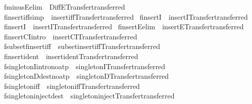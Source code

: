 \begin{isabellebody}
\isamarkupfalse%
\ fminusE{\isacharbrackleft}elim{\isacharbang}{\isacharbrackright}\ {\isacharequal}\ DiffE{\isacharbrackleft}Transfer{\isachardot}transferred{\isacharbrackright}\isanewline
{}\isamarkupfalse%
\ finsert{\isacharunderscore}iff{\isacharbrackleft}simp{\isacharbrackright}\ {\isacharequal}\ insert{\isacharunderscore}iff{\isacharbrackleft}Transfer{\isachardot}transferred{\isacharbrackright}\isanewline
{}\isamarkupfalse%
\ finsertI{}\ {\isacharequal}\ insertI{}{\isacharbrackleft}Transfer{\isachardot}transferred{\isacharbrackright}\isanewline
{}\isamarkupfalse%
\ finsertI{}\ {\isacharequal}\ insertI{}{\isacharbrackleft}Transfer{\isachardot}transferred{\isacharbrackright}\isanewline
{}\isamarkupfalse%
\ finsertE{\isacharbrackleft}elim{\isacharbang}{\isacharbrackright}\ {\isacharequal}\ insertE{\isacharbrackleft}Transfer{\isachardot}transferred{\isacharbrackright}\isanewline
{}\isamarkupfalse%
\ finsertCI{\isacharbrackleft}intro{\isacharbang}{\isacharbrackright}\ {\isacharequal}\ insertCI{\isacharbrackleft}Transfer{\isachardot}transferred{\isacharbrackright}\isanewline
{}\isamarkupfalse%
\ fsubset{\isacharunderscore}finsert{\isacharunderscore}iff\ {\isacharequal}\ subset{\isacharunderscore}insert{\isacharunderscore}iff{\isacharbrackleft}Transfer{\isachardot}transferred{\isacharbrackright}\isanewline
{}\isamarkupfalse%
\ finsert{\isacharunderscore}ident\ {\isacharequal}\ insert{\isacharunderscore}ident{\isacharbrackleft}Transfer{\isachardot}transferred{\isacharbrackright}\isanewline
{}\isamarkupfalse%
\ fsingletonI{\isacharbrackleft}intro{\isacharbang}{\isacharcomma}no{\isacharunderscore}atp{\isacharbrackright}\ {\isacharequal}\ singletonI{\isacharbrackleft}Transfer{\isachardot}transferred{\isacharbrackright}\isanewline
{}\isamarkupfalse%
\ fsingletonD{\isacharbrackleft}dest{\isacharbang}{\isacharcomma}no{\isacharunderscore}atp{\isacharbrackright}\ {\isacharequal}\ singletonD{\isacharbrackleft}Transfer{\isachardot}transferred{\isacharbrackright}\isanewline
{}\isamarkupfalse%
\ fsingleton{\isacharunderscore}iff\ {\isacharequal}\ singleton{\isacharunderscore}iff{\isacharbrackleft}Transfer{\isachardot}transferred{\isacharbrackright}\isanewline
{}\isamarkupfalse%
\ fsingleton{\isacharunderscore}inject{\isacharbrackleft}dest{\isacharbang}{\isacharbrackright}\ {\isacharequal}\ singleton{\isacharunderscore}inject{\isacharbrackleft}Transfer{\isachardot}transferred{\isacharbrackright}\isanewline

\end{isabellebody}
